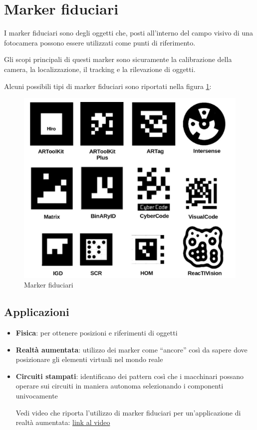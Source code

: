 \documentclass[12pt,a4paper,openright,twoside]{book}
\begin{document}
\section{Marker fiduciari} \label{sec:marker_fiduciari}
I marker fiduciari sono degli oggetti che, posti all'interno del campo visivo di una fotocamera possono essere utilizzati come punti di riferimento. 

Gli scopi principali di questi marker sono sicuramente la calibrazione della camera, la localizzazione, il tracking e la rilevazione di oggetti.

Alcuni possibili tipi di marker fiduciari sono riportati nella figura \ref{fig:marker_fiduciari}:

\begin{figure}[h!]
	\centering
	\includegraphics[width=0.8\linewidth]{./figures/fiducialMarkers.png}
	\caption{Marker fiduciari\cite{GARRIDOJURADO20142280}}
	\label{fig:marker_fiduciari}
\end{figure}

\subsection{Applicazioni}
\begin{itemize}
	\item \textbf{Fisica}: per ottenere posizioni e riferimenti di oggetti
	\item \textbf{Realtà aumentata}: utilizzo dei marker come ``ancore'' così da sapere dove posizionare gli elementi virtuali nel mondo reale
	\item \textbf{Circuiti stampati}: identificano dei pattern così che i macchinari possano operare sui circuiti in maniera autonoma selezionando i componenti univocamente
	
	
	Vedi video che riporta l'utilizzo di marker fiduciari per un'applicazione di realtà aumentata:
	\href{https://youtu.be/nsu9tNIJ6F0?si=MB4zTZP5yiCO9aW7}{link al video}
\end{itemize}
\end{document}
